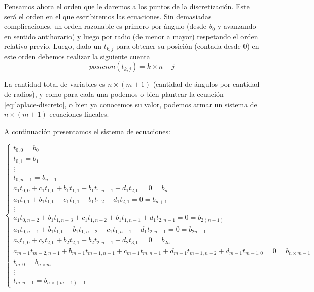 Pensamos ahora el orden que le daremos a los puntos de la discretización. Este será el orden en el que escribiremos las ecuaciones. Sin demasiadas complicaciones, un orden razonable es primero por ángulo (desde $\theta_0$ y avanzando en sentido antihorario) y luego por radio (de menor a mayor) respetando el orden relativo previo. Luego, dado un $t_{k,j}$ para obtener su posición (contada desde 0) en este orden debemos realizar la siguiente cuenta
\begin{equation}
\label{eq:posicion}
	posicion(t_{k,j}) = k\times n + j
\end{equation}

La cantidad total de variables es $n\times(m+1)$ (cantidad de ángulos por cantidad de radios), y como para cada una podemos o bien plantear la ecuación \ref{eq:laplace-discreto}, o bien ya conocemos su valor, podemos armar un sistema de $n\times(m+1)$ ecuaciones lineales.

A continuación presentamos el sistema de ecuaciones: 

\begin{equation}
\label{eq:sisecu}
  \left\lbrace
  \begin{array}{l}
     t_{0,0} = b_0 \\
     t_{0,1} = b_1 \\
     \vdots\\
     t_{0,n-1} = b_{n-1} \\
		 a_1 t_{0,0} + c_1 t_{1,0} + b_1 t_{1, 1} + b_1 t_{1, n-1} + d_1 t_{2, 0} = 0 = b_{n}\\
		 a_1 t_{0,1} + b_1 t_{1, 0} + c_1 t_{1,1} + b_1 t_{1,2} + d_1 t_{2,1} = 0 = b_{n+1} \\
		 \vdots\\
		 a_1 t_{0,n-2} + b_1 t_{1, n-3} + c_1 t_{1,n-2} + b_1 t_{1,n-1} + d_1 t_{2,n-1} = 0 = b_{2(n-1)} \\
		 a_1 t_{0,n-1} + b_1 t_{1, 0} + b_1 t_{1, n-2} + c_1 t_{1,n-1} + d_1 t_{2, n-1} = 0= b_{2n - 1}\\
		 a_2 t_{1,0} + c_2 t_{2,0} + b_2 t_{2, 1} + b_2 t_{2, n-1}  + d_2 t_{3, 0} = 0 = b_{2n}\\

		 a_{m-1} t_{m-2,n-1} + b_{m-1} t_{m-1,n-1} + c_{m-1} t_{m, n-1} + d_{m-1} t_{m-1, n-2} + d_{m-1} t_{m-1, 0} = 0 = b_{n\times m -1}\\
		 t_{m,0} = b_{n\times m}\\
		 \vdots\\
		 t_{m, n-1} = b_{n\times (m+1)-1}
		 
  \end{array}
  \right.
\end{equation}

